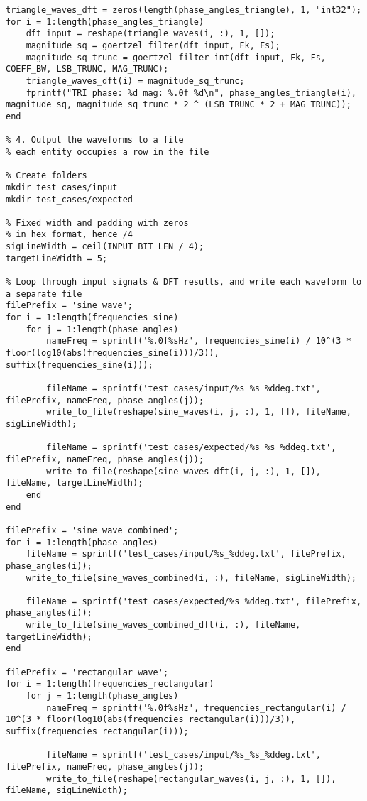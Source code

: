 \begin{lstlisting}
triangle_waves_dft = zeros(length(phase_angles_triangle), 1, "int32");
for i = 1:length(phase_angles_triangle)
    dft_input = reshape(triangle_waves(i, :), 1, []);
    magnitude_sq = goertzel_filter(dft_input, Fk, Fs);
    magnitude_sq_trunc = goertzel_filter_int(dft_input, Fk, Fs, COEFF_BW, LSB_TRUNC, MAG_TRUNC);
    triangle_waves_dft(i) = magnitude_sq_trunc;
    fprintf("TRI phase: %d mag: %.0f %d\n", phase_angles_triangle(i), magnitude_sq, magnitude_sq_trunc * 2 ^ (LSB_TRUNC * 2 + MAG_TRUNC));
end

% 4. Output the waveforms to a file
% each entity occupies a row in the file

% Create folders
mkdir test_cases/input
mkdir test_cases/expected

% Fixed width and padding with zeros
% in hex format, hence /4
sigLineWidth = ceil(INPUT_BIT_LEN / 4);
targetLineWidth = 5;

% Loop through input signals & DFT results, and write each waveform to a separate file
filePrefix = 'sine_wave';
for i = 1:length(frequencies_sine)
    for j = 1:length(phase_angles)
        nameFreq = sprintf('%.0f%sHz', frequencies_sine(i) / 10^(3 * floor(log10(abs(frequencies_sine(i)))/3)), suffix(frequencies_sine(i)));

        fileName = sprintf('test_cases/input/%s_%s_%ddeg.txt', filePrefix, nameFreq, phase_angles(j));
        write_to_file(reshape(sine_waves(i, j, :), 1, []), fileName, sigLineWidth);

        fileName = sprintf('test_cases/expected/%s_%s_%ddeg.txt', filePrefix, nameFreq, phase_angles(j));
        write_to_file(reshape(sine_waves_dft(i, j, :), 1, []), fileName, targetLineWidth);
    end
end

filePrefix = 'sine_wave_combined';
for i = 1:length(phase_angles)
    fileName = sprintf('test_cases/input/%s_%ddeg.txt', filePrefix, phase_angles(i));
    write_to_file(sine_waves_combined(i, :), fileName, sigLineWidth);

    fileName = sprintf('test_cases/expected/%s_%ddeg.txt', filePrefix, phase_angles(i));
    write_to_file(sine_waves_combined_dft(i, :), fileName, targetLineWidth);
end

filePrefix = 'rectangular_wave';
for i = 1:length(frequencies_rectangular)
    for j = 1:length(phase_angles)
        nameFreq = sprintf('%.0f%sHz', frequencies_rectangular(i) / 10^(3 * floor(log10(abs(frequencies_rectangular(i)))/3)), suffix(frequencies_rectangular(i)));

        fileName = sprintf('test_cases/input/%s_%s_%ddeg.txt', filePrefix, nameFreq, phase_angles(j));
        write_to_file(reshape(rectangular_waves(i, j, :), 1, []), fileName, sigLineWidth);


\end{lstlisting}
